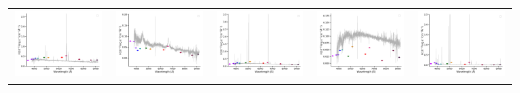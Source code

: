 \begin{center}
\begin{longtable}{l l l l l }
    \includegraphics[width=0.2\linewidth, clip]{Figs/Figs-sdss/spec-1829-53494-0282-SPLUS-n05n53-005761.pdf} & \includegraphics[width=0.2\linewidth, clip]{Figs/Figs-sdss/spec-1901-53261-0086-SPLUS-s02s13-032892.pdf} & \includegraphics[width=0.2\linewidth, clip]{Figs/Figs-sdss/spec-1919-53240-0073-STRIPE82-0111-068928.pdf} & \includegraphics[width=0.2\linewidth, clip]{Figs/Figs-sdss/spec-1919-53240-0621-STRIPE82-0112-020655.pdf} & \includegraphics[width=0.2\linewidth, clip]{Figs/Figs-sdss/spec-2568-54153-0481-SPLUS-n01s27-050095.pdf} \\

\end{longtable}
\end{center}
